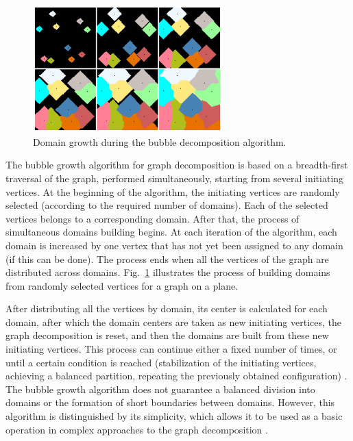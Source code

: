 \documentclass[
11pt,%
tightenlines,%
twoside,%
onecolumn,%
nofloats,%
nobibnotes,%
nofootinbib,%
superscriptaddress,%
noshowpacs,%
centertags]%
{revtex4}
\begin{document}
\begin{figure}[h]
\setcaptionmargin{5mm}
\onelinecaptionstrue  %
\includegraphics[width=0.65\textwidth]{pics/incr.pdf}
\caption{Domain growth during the bubble decomposition algorithm.}\label{fig:incr}
\end{figure}

The bubble growth algorithm for graph decomposition \cite{17Fan} is based on a breadth-first traversal of the graph, performed simultaneously, starting from several initiating vertices.
At the beginning of the algorithm, the initiating vertices are randomly selected (according to the required number of domains).
Each of the selected vertices belongs to a corresponding domain.
After that, the process of simultaneous domains building begins.
At each iteration of the algorithm, each domain is increased by one vertex that has not yet been assigned to any domain (if this can be done).
The process ends when all the vertices of the graph are distributed across domains.
Fig.~\ref{fig:incr} illustrates the process of building domains from randomly selected vertices for a graph on a plane.

After distributing all the vertices by domain, its center is calculated for each domain, after which the domain centers are taken as new initiating vertices, the graph decomposition is reset, and then the domains are built from these new initiating vertices.
This process can continue either a fixed number of times, or until a certain condition is reached (stabilization of the initiating vertices, achieving a balanced partition, repeating the previously obtained configuration) \cite{18Golovchenko}.
The bubble growth algorithm does not guarantee a balanced division into domains or the formation of short boundaries between domains.
However, this algorithm is distinguished by its simplicity, which allows it to be used as a basic operation in complex approaches to the graph decomposition \cite{19Wu}.
\end{document}
